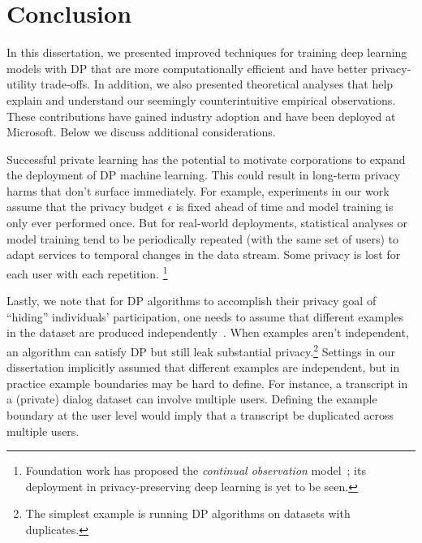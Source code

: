\chapter{Conclusion}\label{ch_6}

In this dissertation, we presented improved techniques for training deep learning models with DP that are more computationally efficient and have better privacy-utility trade-offs.
In addition, we also presented theoretical analyses that help explain and understand our seemingly counterintuitive empirical observations.
These contributions have gained industry adoption and have been deployed at Microsoft.
Below we discuss additional considerations.


Successful private learning has the potential to motivate corporations to expand the deployment of DP machine learning.
This could result in long-term privacy harms that don't surface immediately.
For example, experiments in our work assume that the privacy budget $\epsilon$ is fixed ahead of time and model training is only ever performed once.
But for real-world deployments, statistical analyses or model training tend to be periodically repeated (with the same set of users) to adapt services to temporal changes in the data stream.
Some privacy is lost for each user with each repetition. \footnote{Foundation work has proposed the \emph{continual observation} model~\citep{dwork2010differential}; its deployment in privacy-preserving deep learning is yet to be seen.}

Lastly, we note that for DP algorithms to accomplish their privacy goal of ``hiding'' individuals' participation, one needs to assume that different examples in the dataset are produced independently~\citep{kifer2011no}.
When examples aren't independent, an algorithm can satisfy DP but still leak substantial privacy.\footnote{The simplest example is running DP algorithms on datasets with duplicates.}
Settings in our dissertation implicitly assumed that different examples are independent, but in practice example boundaries may be hard to define.
For instance, a transcript in a (private) dialog dataset can involve multiple users.
Defining the example boundary at the user level would imply that a transcript be duplicated across multiple users.

